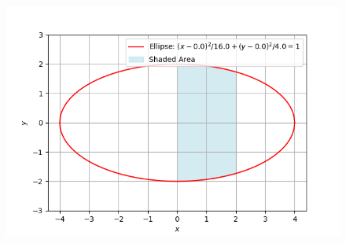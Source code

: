 \documentclass[journal]{IEEEtran}
\numberwithin{equation}{enumi}
\numberwithin{figure}{enumi}
\begin{document}
\begin{figure}[!ht]
    \centering
    \includegraphics[width=\linewidth]{figs/fig1.png}
    \caption{}
\end{figure}
\end{document}
